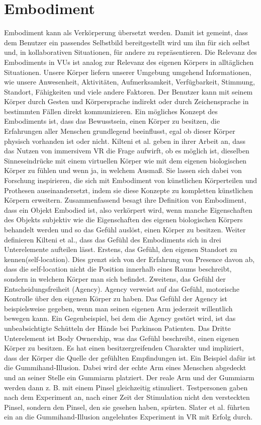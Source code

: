 \section{Embodiment}
Embodiment kann als Verkörperung übersetzt werden. Damit ist gemeint, dass dem Benutzer ein passendes Selbstbild bereitgestellt wird um ihn für sich selbst und, in kollaborativen Situationen, für andere zu repräsentieren. Die Relevanz des Embodiments in VUs ist analog zur Relevanz des eigenen Körpers in alltäglichen Situationen. Unsere Körper liefern unserer Umgebung umgehend Informationen, wie unsere Anwesenheit, Aktivitäten, Aufmerksamkeit, Verfügbarkeit, Stimmung, Standort, Fähigkeiten und viele andere Faktoren. Der Benutzer kann mit seinem Körper durch Gesten und Körpersprache indirekt oder durch Zeichensprache in bestimmten Fällen direkt kommunizieren. \cite{Benford2010}
Ein mögliches Konzept des Embodiments ist, dass das Bewusstsein, einen Körper zu besitzen, die Erfahrungen aller Menschen grundlegend beeinflusst, egal ob dieser Körper physisch vorhanden ist oder nicht.\cite{Tham2018} Kilteni et al. \cite{Kilteni2012} geben in ihrer Arbeit an, dass das Nutzen von immersivem VR die Frage aufwirft, ob es möglich ist, dieselben Sinneseindrücke mit einem virtuellen Körper wie mit dem eigenen biologischen Körper zu fühlen und wenn ja, in welchem Ausmaß. Sie lassen sich  dabei von Forschung inspirieren, die sich mit Embodiment von künstlichen Körperteilen und Prothesen auseinandersetzt, indem sie diese Konzepte zu kompletten künstlichen Körpern erweitern. Zusammenfassend besagt ihre Definition von Embodiment, dass ein Objekt Embodied ist, also verkörpert wird, wenn manche Eigenschaften des Objekts subjektiv wie die Eigenschaften des eigenen biologischen Körpers behandelt werden und so das Gefühl auslöst, einen Körper zu besitzen.
Weiter definieren Kilteni et al., dass das Gefühl des Embodiments sich in drei Unterelemente aufteilen lässt. Erstens, das Gefühl, den eigenen Standort zu kennen(self-location).  Dies grenzt sich von der Erfahrung von Presence davon ab, dass die self-location nicht die Position innerhalb eines Raums beschreibt, sondern in welchem Körper man sich befindet. Zweitens, das Gefühl der Entscheidungsfreiheit (Agency). Agency verweist auf das Gefühl, motorische Kontrolle über den eigenen Körper zu haben. Das Gefühl der Agency ist beispielsweise gegeben, wenn man seinen eigenen Arm jederzeit willentlich bewegen kann. Ein Gegenbeispiel, bei dem die Agency gestört wird, ist das unbeabsichtigte Schütteln der Hände bei Parkinson Patienten. Das Dritte Unterelement ist Body Ownership, was das Gefühl beschreibt, einen eigenen Körper zu besitzen. Es hat einen besitzergreifenden Charakter und impliziert, dass der Körper die Quelle der gefühlten Empfindungen ist. Ein Beispiel dafür ist die Gummihand-Illusion. Dabei wird der echte Arm eines Menschen abgedeckt und an seiner Stelle ein Gummiarm platziert. Der reale Arm und der Gummiarm werden dann z. B. mit einem Pinsel gleichzeitig stimuliert. Testpersonen gaben nach dem Experiment an, nach einer Zeit der Stimulation nicht den versteckten Pinsel, sondern den Pinsel, den sie gesehen haben, spürten.\cite{Botvinick1998} Slater et al. \cite{Slater2008} führten ein an die Gummihand-Illusion angelehntes Experiment in VR mit Erfolg durch.


